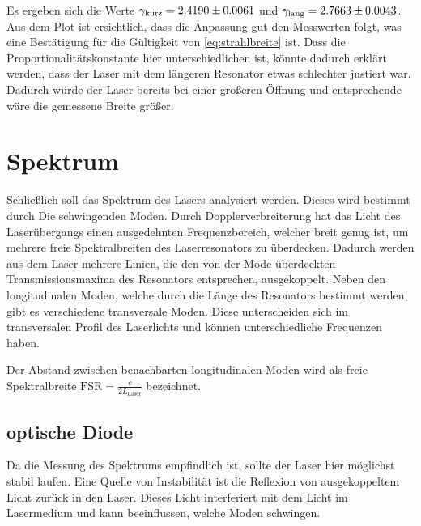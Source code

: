 \documentclass{article}
\newcommand{\defc}{black}
\newcommand{\colorT}[2][blue]{\color{#1}{#2}\color{\defc}}
\newcommand{\todo}[1]{\colorT[red]{\textbf{(#1)}}}
\newcommand{\mr}{\mathrm}
\begin{document}
Es ergeben sich die Werte $\gamma_\mr{kurz} = \num{2.4190\pm0.0061}$ und $\gamma_\mr{lang} = \num{2.7663\pm0.0043}$.
Aus dem Plot ist ersichtlich, dass die Anpassung gut den Messwerten folgt,
was eine Bestätigung für die Gültigkeit von \eqref{eq:strahlbreite} ist.
Dass die Proportionalitätskonstante hier unterschiedlichen ist,
könnte dadurch erklärt werden, dass der Laser mit dem längeren Resonator etwas schlechter justiert war.
Dadurch würde der Laser bereits bei einer größeren Öffnung und entsprechende wäre die gemessene Breite größer.


\section{Spektrum}
Schließlich soll das Spektrum des Lasers analysiert werden. Dieses wird bestimmt durch
Die schwingenden Moden. Durch Dopplerverbreiterung hat das Licht des Laserübergangs
einen ausgedehnten Frequenzbereich, welcher breit genug ist, um mehrere freie Spektralbreiten des
Laserresonators zu überdecken.
Dadurch werden aus dem Laser mehrere Linien, die den von der Mode
überdeckten Transmissionsmaxima des Resonators entsprechen, ausgekoppelt.
Neben den longitudinalen Moden, welche durch die Länge des Resonators bestimmt werden,
gibt es verschiedene transversale Moden. Diese unterscheiden sich im transversalen Profil des Laserlichts und
können unterschiedliche Frequenzen haben.

Der Abstand zwischen benachbarten longitudinalen Moden wird als freie Spektralbreite $\mr{FSR} = \frac{c}{2L_\mr{Laser}}$
\cite{Anleitung} bezeichnet.


\subsection{optische Diode}
Da die Messung des Spektrums empfindlich ist, sollte der Laser hier möglichst stabil laufen.
Eine Quelle von Instabilität ist die Reflexion von ausgekoppeltem Licht zurück in den Laser. 
Dieses Licht interferiert mit dem Licht im Lasermedium und kann beeinflussen, welche Moden schwingen.
\end{document}
